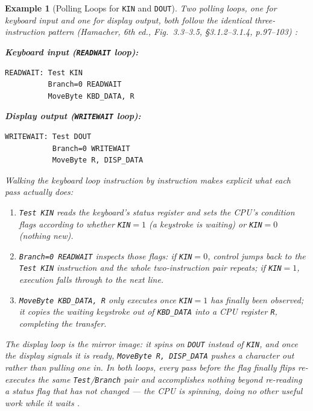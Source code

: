 \documentclass[11pt]{article}
\newtheorem{example}{Example}[section]
\begin{document}
\begin{example}[Polling Loops for \texttt{KIN} and \texttt{DOUT}]
\label{ex:polling}
Two polling loops, one for keyboard input and one for display output, both follow the identical three-instruction pattern (Hamacher, 6th ed., Fig.~3.3--3.5, \S3.1.2--3.1.4, p.97--103) \cite{Hamacher2002_computer_organization}:

\textbf{Keyboard input (\texttt{READWAIT} loop):}
\begin{verbatim}
READWAIT: Test KIN
          Branch=0 READWAIT
          MoveByte KBD_DATA, R
\end{verbatim}

\textbf{Display output (\texttt{WRITEWAIT} loop):}
\begin{verbatim}
WRITEWAIT: Test DOUT
           Branch=0 WRITEWAIT
           MoveByte R, DISP_DATA
\end{verbatim}

Walking the keyboard loop instruction by instruction makes explicit what each pass actually does:
\begin{enumerate}
  \item \texttt{Test KIN} reads the keyboard's status register and sets the CPU's condition flags according to whether \texttt{KIN}$=1$ (a keystroke is waiting) or \texttt{KIN}$=0$ (nothing new).
  \item \texttt{Branch=0 READWAIT} inspects those flags: if \texttt{KIN}$=0$, control jumps back to the \texttt{Test KIN} instruction and the whole two-instruction pair repeats; if \texttt{KIN}$=1$, execution falls through to the next line.
  \item \texttt{MoveByte KBD\_DATA, R} only executes once \texttt{KIN}$=1$ has finally been observed; it copies the waiting keystroke out of \texttt{KBD\_DATA} into a CPU register \texttt{R}, completing the transfer.
\end{enumerate}
The display loop is the mirror image: it spins on \texttt{DOUT} instead of \texttt{KIN}, and once the display signals it is ready, \texttt{MoveByte R, DISP\_DATA} pushes a character \emph{out} rather than pulling one \emph{in}. In both loops, every pass before the flag finally flips re-executes the same \texttt{Test}/\texttt{Branch} pair and accomplishes nothing beyond re-reading a status flag that has not changed --- the CPU is spinning, doing no other useful work while it waits \cite{Hamacher2002_computer_organization}.
\end{example}
\end{document}
